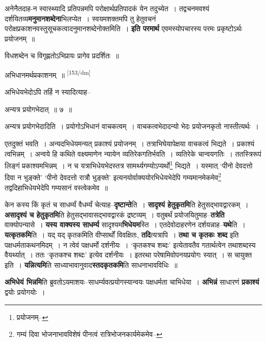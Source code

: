 \documentclass[article,12pt,a4paper]{memoir}
\begin{document}
	  \pstart अनेनैतदाह-न स्वास्थ्यादि प्रतिपन्नमपि परोक्षार्थप्रतिपादकं येन तदुच्येत । तद्वचनमवश्यं दर्शयितव्य\textbf{मनुमानशब्देना}भिलप्येत । स्वयमशक्तमपि तु हेतुवचनं परोक्षप्रकाशनवस्तुसूचकत्वादनुमानशब्देनोक्तमिति । \textbf{इति परमार्थ} एवमस्योपचारस्य परमः प्रकृष्टोऽर्थः प्रयोजनम् ॥
	\pend
      

	  \pstart विधशब्देन च विगृह्णतोऽभिप्रायः प्रागेव प्रदर्शितः ॥
	\pend
      

	  \pstart अभिधानमर्थप्रकाशनम् ॥
	\pend
      \leavevmode\textsuperscript{\rmlatinfont\tiny [153/dm]}

	  \pstart अभिधेयभेदोऽपि तर्हि न स्यादित्याह--
	\pend
       

	  \pstart अन्यत्र प्रयोगभेदात् ॥ ७ ॥
	\pend
       

	  \pstart अन्यत्र प्रयोगभेदादिति । प्रयोगोऽभिधानं वाचकत्वम् । वाचकत्वभेदादन्यो भेदः प्रयोजनकृतो नास्तीत्यर्थः ।
	\pend
       

	  \pstart एतदुक्तं भवति । अन्यदभिधेयमन्यत् प्रकाश्यं प्रयोजनम् । तत्राभिघेयापेक्षया वाचकत्वं भिद्यते । प्रकाश्यं त्वभिन्नम् । अन्वये हि कथिते वक्ष्यमाणेन न्यायेन व्यतिरेकगतिर्भवति । व्यतिरेके चान्वयगतिः । ततस्त्रिरूपं लिङ्गं प्रकाश्यमभिन्नम् । न च यत्राभिधेयभेदस्तत्र सामर्थ्यगम्योऽप्यर्थो\footnote{प्रयोजनम्--\cite{dp-msD-n}} भिद्यते । यस्मात् ‘पीनो देवदत्तो दिवा न भुङ्क्ते’ ‘पीनो देवदत्तो रात्रौ भुङ्क्ते’ इत्यनयोर्वाक्ययोरभिधेयभेदेपि गम्यमानमेकमेव\footnote{गम्यं दिवा भोजनाभावविशेषं पीनत्वं रात्रिभोजनकार्यमेकमेव--\cite{dp-msD-n}} तद्वदिहाभिधेयभेदेपि गम्यसानं वस्त्वेकमेव ॥
	\pend
      

	  \pstart केन कस्य किं कृतं च साधर्म्यं वैधर्म्यं चेत्याह--\textbf{दृष्टान्ते}ति । \textbf{सादृश्यं हेतुकृतमि}ति हेतुसद्भावद्वारकम् । \textbf{असादृश्यं च हेतुकृतमि}ति हेतुसद्भावासद्भावद्वारकं द्रष्टव्यम् । वतुबर्थं प्रयोजयितुमाह--\textbf{तत्रेति} वाक्योपन्यासे । \textbf{यस्य वाक्यस्य साधर्म्य} सादृश्यम\textbf{भिधेयम}स्ति । एतदेवोदाहरणेन दर्शयन्नाह--\textbf{यथे}ति । \textbf{यत्कृतकमि}ति । यद् यद् कृतकमिति वीप्सार्थों विवक्षितः, \textbf{तदि}त्यत्रापि । \textbf{तथा च कृतकः शब्द} इति पक्षधर्मताकथनमिदम् । न त्वेवं पक्षधर्मो दर्शनीयः । ‘कृतकश्च शब्दः’ इत्येतावतैव गतार्थत्वेन तथाशब्दस्य वैयर्थ्यात् । ततः ‘कृतकश्च शब्दः’ इत्येव दर्शनीयः । इतरथा परेषामिवोपनयप्रयोगः स्यात् । स चायुक्त इति । \textbf{यन्नित्यमि}ति साध्याभावानुवाद\textbf{स्तदकृतकमि}ति साधनाभावविधिः ॥
	\pend
      

	  \pstart \textbf{अभिधेयं भिन्नमि}ति ब्रुवतोऽयमाशयः--साधर्म्यवत्प्रयोगस्यान्वयः पक्षधर्मता चाभिधेया । \textbf{अभिन्नं} साधारणं \textbf{प्रकाश्यं} द्वयोः प्रयोगयोः ।
	\pend
      
\end{document}
